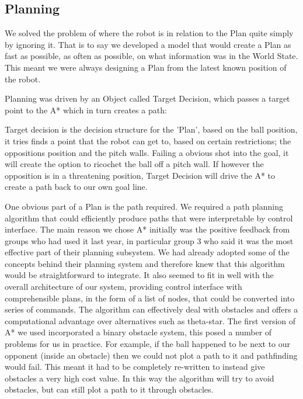 \subsection{Planning}



We solved the problem of where the robot is in relation to the Plan quite simply
by ignoring it. That is to say we developed a model that would create a Plan
as fast as possible, as often as possible, on what information was in the World
State. This meant we were always designing a Plan from the latest known position 
of the robot.

Planning was driven by an Object called Target Decision, which passes a target
point to the A* which in turn creates a path:


Target decision is the decision structure for the 'Plan', based on the ball 
position, it tries finds a point that the robot can get to, based on certain 
restrictions; the oppositions position and the pitch walls. Failing a obvious
shot into the goal, it will create the option to ricochet the ball off a pitch
wall. If however the opposition is in a threatening position, Target Decision
will drive the A* to create a path back to our own goal line.


One obvious part of a Plan is the path required. We required a path planning algorithm that could efficiently produce paths that were interpretable by control interface. The main reason we chose A* initially was the positive feedback from groups who had used it last year, in particular group 3 who said it was the most effective part of their planning subsystem. We had already adopted some of the concepts behind their planning system and therefore knew that this algorithm would be straightforward to integrate. It also seemed to fit in well with the overall architecture of our system, providing control interface with comprehensible plans, in the form of a list of nodes, that could be converted into series of commands. The algorithm can effectively deal with obstacles and offers a computational advantage over alternatives such as theta-star. The first version of A* we used incorporated a binary obstacle system, this posed a number of problems for us in practice. For example, if the ball happened to be next to our opponent (inside an obstacle) then we could not plot a path to it and pathfinding would fail. This meant it had to be completely re-written to instead give obstacles a very high cost value. In this way the algorithm will try to avoid obstacles, but can still plot a path to it through obstacles.


